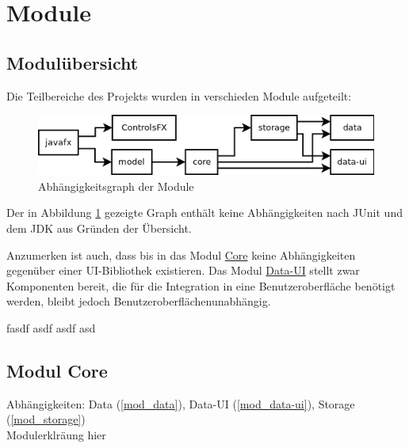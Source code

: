 
\newcommand{\depBox}[1]{
	\begin{adjustbox}{minipage=0.85\textwidth,margin=0 \smallskipamount,center}
		Abhängigkeiten:	 \quad #1
	\end{adjustbox} ~\\
}
\newcommand{\refModCore}{\hyperref[mod_core]{Core}}
\newcommand{\refModData}{\hyperref[mod_data]{Data}}
\newcommand{\refModDataUI}{\hyperref[mod_data-ui]{Data-UI}}
\newcommand{\refModJavaFX}{\hyperref[mod_javafx]{JavaFX}}
\newcommand{\refModModel}{\hyperref[mod_model]{Model}}
\newcommand{\refModStorage}{\hyperref[mod_storage]{Storage}}

\section{Module}
\subsection{Modulübersicht}
Die Teilbereiche des Projekts wurden in verschieden Module aufgeteilt:
\begin{figure}[hb!]
	\centering
	\includegraphics[width=.8\textwidth]{module_dependencies.png}
	\caption{Abhängigkeitsgraph der Module}
	\label{mod_dep_view}
\end{figure}

Der in Abbildung \ref{mod_dep_view} gezeigte Graph enthält keine Abhängigkeiten nach JUnit und
dem JDK aus Gründen der Übersicht.

Anzumerken ist auch, dass bis in das Modul \refModCore{} keine Abhängigkeiten
gegenüber einer UI-Bibliothek existieren. Das Modul \hyperref[mod_data-ui]{Data-UI} stellt
zwar Komponenten bereit, die für die Integration in eine Benutzeroberfläche benötigt werden,
bleibt jedoch Benutzeroberflächenunabhängig.

fasdf asdf asdf asd



\subsection{Modul Core}
\label{mod_core}
\depBox{Data (\ref{mod_data}), Data-UI (\ref{mod_data-ui}), Storage (\ref{mod_storage})}

Modulerklräung hier




